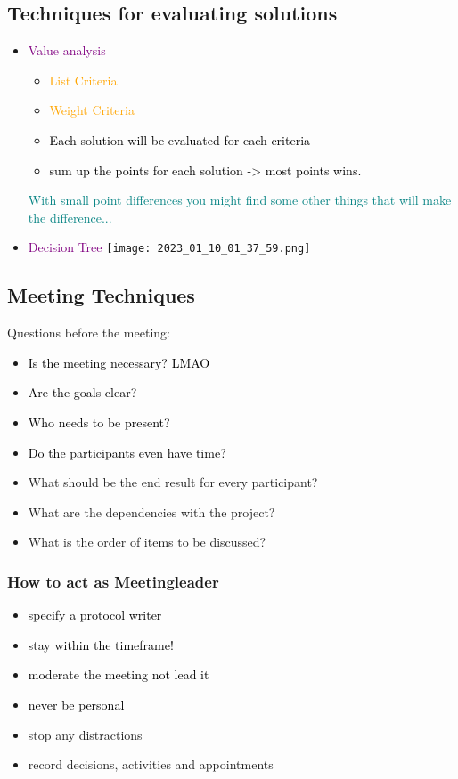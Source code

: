 \documentclass[main.tex,fontsize=12pt,paper=a4,paper=landscape,DIV=calc,]{scrartcl}
\begin{document}
\begin{multicols*}{2}
\subsection{Techniques for evaluating solutions}
\begin{itemize}
\item \textcolor{purple}{Value analysis}\newline
  \begin{itemize}
  \item \textcolor{orange}{List Criteria}
  \item \textcolor{orange}{Weight Criteria}
  \item \textcolor{black}{Each solution will be evaluated for each criteria}
  \item \textcolor{black}{sum up the points for each solution -> most points wins.}
  \end{itemize} 
  \textcolor{teal}{With small point differences you might find some other things that will make the difference...}
\item \textcolor{purple}{Decision Tree}\newline
  \texttt{[image: 2023\_01\_10\_01\_37\_59.png]}
\end{itemize} 

\subsection{Meeting Techniques}
Questions before the meeting:\newline
\begin{itemize}
\item \textcolor{black}{Is the meeting necessary? LMAO}
\item \textcolor{black}{Are the goals clear?}
\item \textcolor{black}{Who needs to be present?}
\item \textcolor{black}{Do the participants even have time?}
\item What should be the end result for every participant?
\item What are the dependencies with the project?
\item What is the order of items to be discussed?
\end{itemize} 

\subsubsection{How to act as Meetingleader}
\begin{itemize}
\item \textcolor{black}{specify a protocol writer}
\item \textcolor{black}{stay within the timeframe!}
\item \textcolor{black}{moderate the meeting not lead it}
\item \textcolor{black}{never be personal}
\item stop any distractions
\item record decisions, activities and appointments
\end{itemize} 


\end{multicols*}
\end{document}
